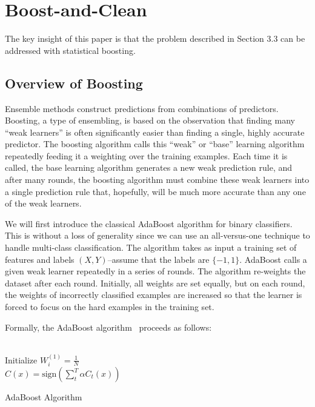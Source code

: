 \section{Boost-and-Clean}
The key insight of this paper is that the problem described in Section 3.3 can be addressed with statistical boosting.

\subsection{Overview of Boosting}
Ensemble methods construct predictions from combinations of predictors.
Boosting, a type of ensembling, is based on the observation that finding many ``weak learners'' is often significantly easier than finding a single, highly accurate predictor. 
The boosting algorithm calls this ``weak'' or ``base'' learning algorithm repeatedly feeding it a  weighting over the training examples.
Each time it is called, the base learning algorithm generates a new weak prediction rule, and after many rounds, the boosting algorithm must combine these weak learners into a single prediction rule that, hopefully, will be much more accurate than any one of the weak learners.

We will first introduce the classical AdaBoost algorithm for binary classifiers.
This is without a loss of generality since we can use an all-versus-one technique to handle multi-class classification.
The algorithm takes as input a training set of features and labels $(X,Y)$--assume that the labels are $\{-1, 1\}$.
AdaBoost calls a given weak learner repeatedly in a series of rounds. 
The algorithm re-weights the dataset after each round. Initially, all weights are set equally, but on each round, the weights of incorrectly classified examples are increased so that the learner is forced to focus on the hard examples in the training set.

Formally, the AdaBoost algorithm~\cite{freund1995desicion} proceeds as follows:
\begin{algorithm}
\\
Initialize $W^{(1)}_i = \frac{1}{N}$\\
\Return $C(x) = \text{sign}(\sum_t^T \alpha C_t(x) )$
\caption{AdaBoost Algorithm}
\label{alg:adaboost}
\end{algorithm}


